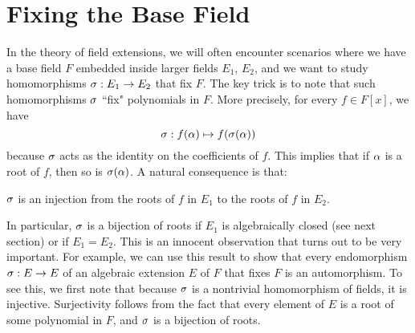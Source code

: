 \section{Fixing the Base Field} \label{base-fix}
In the theory of field extensions, we will often encounter scenarios where we have a base field $F$ embedded inside larger fields $E_1$, $E_2$, and we want to study homomorphisms $\sigma: E_1 \rightarrow E_2$ that fix $F$. The key trick is to note that such homomorphisms $\sigma$ ``fix" polynomials in $F$. More precisely, for every $f \in F[x]$, we have
\[
    \sigma: f(\alpha) \mapsto f(\sigma(\alpha))
\]
because $\sigma$ acts as the identity on the coefficients of $f$.
This implies that if $\alpha$ is a root of $f$, then so is $\sigma(\alpha)$. A natural consequence is that:
\begin{center}
    $\sigma$ is an injection from the roots of $f$ in $E_1$ to the roots of $f$ in $E_2$.
\end{center}
In particular, $\sigma$ is a bijection of roots if $E_1$ is algebraically closed (see next section) or if $E_1 = E_2$. This is an innocent observation that turns out to be very important. For example, we can use this result to show that every endomorphism $\sigma: E \rightarrow E$ of an algebraic extension $E$ of $F$ that fixes $F$ is an automorphism. To see this, we first note that because $\sigma$ is a nontrivial homomorphism of fields, it is injective. Surjectivity follows from the fact that every element of $E$ is a root of some polynomial in $F$, and $\sigma$ is a bijection of roots.
